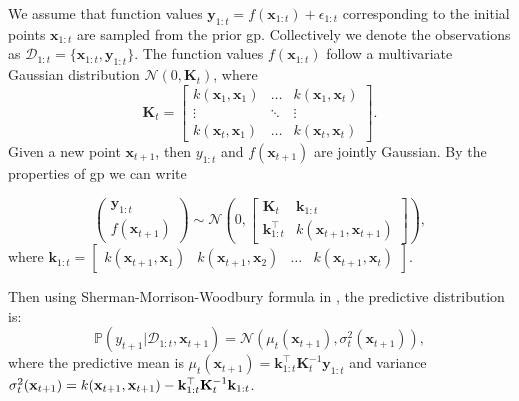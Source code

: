 
We assume that function values ${\mathbf{y}}_{1:t} = f(\mathbf{x}_{1:t})+\epsilon_{1:t}$ corresponding to the initial points $\mathbf{x}_{1:t}$ are sampled
from the prior \ac{gp}. Collectively we denote the observations as $\mathcal{D}_{1:t} = \{\mathbf{x}_{1:t}, \mathbf{y}_{1:t}\}$. The function
values $f(\mathbf{x}_{1:t})$ follow a multivariate Gaussian distribution $\mathcal{N}(0, \mathbf{K}_t)$, where
\[ \mathbf{K}_t = \begin{bmatrix} 
    k(\mathbf{x}_1, \mathbf{x}_1) & \dots  & k(\mathbf{x}_1, \mathbf{x}_t)\\
    \vdots & \ddots & \vdots\\
    k(\mathbf{x}_t, \mathbf{x}_1) & \dots  & k(\mathbf{x}_t, \mathbf{x}_t)
    \end{bmatrix}.
\]
Given a new point $\mathbf{x}_{t+1}$, then $y_{1:t}$ and $f(\mathbf{x}_{t+1})$ are jointly Gaussian. By the properties of \ac{gp} we can write

\[
\begin{pmatrix}
\mathbf{y}_{1:t} \\
f(\mathbf{x}_{t+1})
\end{pmatrix} \sim \mathcal{N}\left(0, \begin{bmatrix}
\mathbf{K}_t & \mathbf{k}_{1:t} \\
\mathbf{k}_{1:t}^\top & k(\mathbf{x}_{t+1}, \mathbf{x}_{t+1})
\end{bmatrix} \right), 
\]
where $\mathbf{k}_{1:t} = \begin{bmatrix}
k(\mathbf{x}_{t+1}, \mathbf{x}_1) & k(\mathbf{x}_{t+1}, \mathbf{x}_2) & \dots & k(\mathbf{x}_{t+1}, \mathbf{x}_t)
\end{bmatrix}$.

Then using Sherman-Morrison-Woodbury formula in \citet{rasmussen2006gaussian}, the predictive distribution is:
\[ \mathbb{P}(y_{t+1} \lvert \mathcal{D}_{1:t}, \mathbf{x}_{t+1})= \mathcal{N}(\mu_t(\mathbf{x}_{t+1}), \sigma_t^2(\mathbf{x}_{t+1})), 
\]
where the predictive mean is $\mu_t(\mathbf{x}_{t+1}) = \mathbf{k}_{1:t}^\top \mathbf{K}_t^{-1} \mathbf{y}_{1:t}$ and variance $\sigma_{t}^{2}({\bf x}_{t+1}) = k({\bf x}_{t+1},{\bf x}_{t+1})-{\bf k}_{1:t}^{\top} \mathbf{K}_t^{-1}{\bf k}_{1:t}$. 

